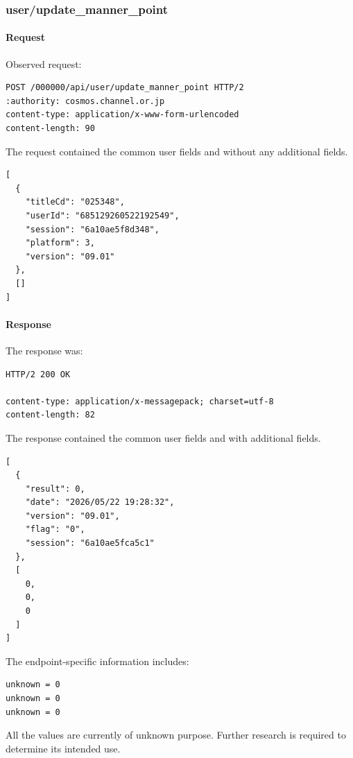 \subsubsection{user/update\_manner\_point}
\label{subsec:api_user_update_manner_point}

\paragraph{Request}

Observed request:

\begin{lstlisting}
POST /000000/api/user/update_manner_point HTTP/2
:authority: cosmos.channel.or.jp
content-type: application/x-www-form-urlencoded
content-length: 90
\end{lstlisting}

The request contained the common user fields and without any additional fields.

\begin{lstlisting}
[
  {
    "titleCd": "025348",
    "userId": "685129260522192549",
    "session": "6a10ae5f8d348",
    "platform": 3,
    "version": "09.01"
  },
  []
]
\end{lstlisting}

\newpage

\paragraph{Response}

The response was:

\begin{lstlisting}
HTTP/2 200 OK

content-type: application/x-messagepack; charset=utf-8
content-length: 82
\end{lstlisting}

The response contained the common user fields and with additional fields.

\begin{lstlisting}
[
  {
    "result": 0,
    "date": "2026/05/22 19:28:32",
    "version": "09.01",
    "flag": "0",
    "session": "6a10ae5fca5c1"
  },
  [
    0,
    0,
    0
  ]
]
\end{lstlisting}

The endpoint-specific information includes:

\begin{lstlisting}
unknown = 0
unknown = 0
unknown = 0
\end{lstlisting}

\begin{tcolorbox}[colback=yellow!10,colframe=orange!80!black,title=Warning]
All the values are currently of unknown purpose.
Further research is required to determine its intended use.
\end{tcolorbox}

\newpage